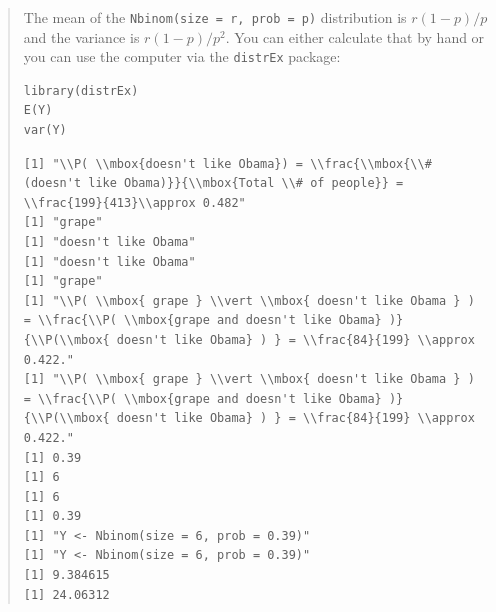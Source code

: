 \documentclass[11pt]{article}
\begin{document}
\subsubsection[]{}
\label{sec-2-2-1}
\begin{quote}
The mean of the \texttt{Nbinom(size = r, prob = p)} distribution is \(r(1 - p)/p\) and the variance is \(r(1 - p)/p^2\).  You can either calculate that by hand or you can use the computer via the \texttt{distrEx} package:

\begin{verbatim}
library(distrEx)
E(Y)
var(Y)
\end{verbatim}

\begin{verbatim}
[1] "\\P( \\mbox{doesn't like Obama}) = \\frac{\\mbox{\\#(doesn't like Obama)}}{\\mbox{Total \\# of people}} = \\frac{199}{413}\\approx 0.482"
[1] "grape"
[1] "doesn't like Obama"
[1] "doesn't like Obama"
[1] "grape"
[1] "\\P( \\mbox{ grape } \\vert \\mbox{ doesn't like Obama } ) = \\frac{\\P( \\mbox{grape and doesn't like Obama} )}{\\P(\\mbox{ doesn't like Obama} ) } = \\frac{84}{199} \\approx 0.422."
[1] "\\P( \\mbox{ grape } \\vert \\mbox{ doesn't like Obama } ) = \\frac{\\P( \\mbox{grape and doesn't like Obama} )}{\\P(\\mbox{ doesn't like Obama} ) } = \\frac{84}{199} \\approx 0.422."
[1] 0.39
[1] 6
[1] 6
[1] 0.39
[1] "Y <- Nbinom(size = 6, prob = 0.39)"
[1] "Y <- Nbinom(size = 6, prob = 0.39)"
[1] 9.384615
[1] 24.06312
\end{verbatim}

\end{quote}
\end{document}
